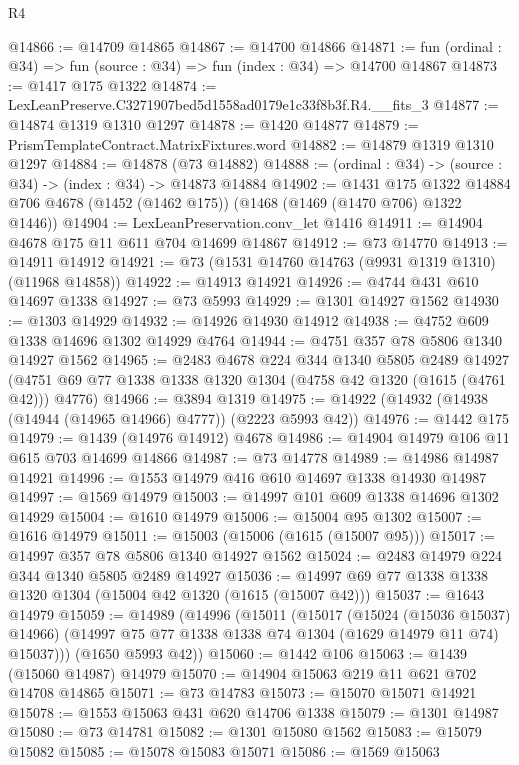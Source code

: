 \begin{lexlean}{R4}
\begin{coremodule}
@14866 := @14709 @14865
@14867 := @14700 @14866
@14871 := fun (ordinal : @34) => fun (source : @34) => fun (index : @34) => @14700 @14867
@14873 := @1417 @175 @1322
@14874 := LexLeanPreserve.C3271907bed5d1558ad0179e1c33f8b3f.R4.__fits_3
@14877 := @14874 @1319 @1310 @1297
@14878 := @1420 @14877
@14879 := PrismTemplateContract.MatrixFixtures.word
@14882 := @14879 @1319 @1310 @1297
@14884 := @14878 (@73 @14882)
@14888 := (ordinal : @34) -> (source : @34) -> (index : @34) -> @14873 @14884
@14902 := @1431
    @175
    @1322
    @14884
    @706
    @4678
    (@1452 (@1462 @175))
    (@1468 (@1469 (@1470 @706) @1322 @1446))
@14904 := LexLeanPreservation.conv_let @1416
@14911 := @14904 @4678 @175 @11 @611 @704 @14699 @14867
@14912 := @73 @14770
@14913 := @14911 @14912
@14921 := @73 (@1531 @14760 @14763 (@9931 @1319 @1310) (@11968 @14858))
@14922 := @14913 @14921
@14926 := @4744 @431 @610 @14697 @1338
@14927 := @73 @5993
@14929 := @1301 @14927 @1562
@14930 := @1303 @14929
@14932 := @14926 @14930 @14912
@14938 := @4752 @609 @1338 @14696 @1302 @14929 @4764
@14944 := @4751 @357 @78 @5806 @1340 @14927 @1562
@14965 := @2483
    @4678
    @224
    @344
    @1340
    @5805
    @2489
    @14927
    (@4751 @69 @77 @1338 @1338 @1320 @1304 (@4758 @42 @1320 (@1615 (@4761 @42))) @4776)
@14966 := @3894 @1319
@14975 := @14922 (@14932 (@14938 (@14944 (@14965 @14966) @4777)) (@2223 @5993 @42))
@14976 := @1442 @175
@14979 := @1439 (@14976 @14912) @4678
@14986 := @14904 @14979 @106 @11 @615 @703 @14699 @14866
@14987 := @73 @14778
@14989 := @14986 @14987 @14921
@14996 := @1553 @14979 @416 @610 @14697 @1338 @14930 @14987
@14997 := @1569 @14979
@15003 := @14997 @101 @609 @1338 @14696 @1302 @14929
@15004 := @1610 @14979
@15006 := @15004 @95 @1302
@15007 := @1616 @14979
@15011 := @15003 (@15006 (@1615 (@15007 @95)))
@15017 := @14997 @357 @78 @5806 @1340 @14927 @1562
@15024 := @2483 @14979 @224 @344 @1340 @5805 @2489 @14927
@15036 := @14997 @69 @77 @1338 @1338 @1320 @1304 (@15004 @42 @1320 (@1615 (@15007 @42)))
@15037 := @1643 @14979
@15059 := @14989
    (@14996
      (@15011
        (@15017
          (@15024 (@15036 @15037) @14966)
          (@14997 @75 @77 @1338 @1338 @74 @1304 (@1629 @14979 @11 @74) @15037)))
      (@1650 @5993 @42))
@15060 := @1442 @106
@15063 := @1439 (@15060 @14987) @14979
@15070 := @14904 @15063 @219 @11 @621 @702 @14708 @14865
@15071 := @73 @14783
@15073 := @15070 @15071 @14921
@15078 := @1553 @15063 @431 @620 @14706 @1338
@15079 := @1301 @14987
@15080 := @73 @14781
@15082 := @1301 @15080 @1562
@15083 := @15079 @15082
@15085 := @15078 @15083 @15071
@15086 := @1569 @15063

\end{coremodule}
\end{lexlean}
